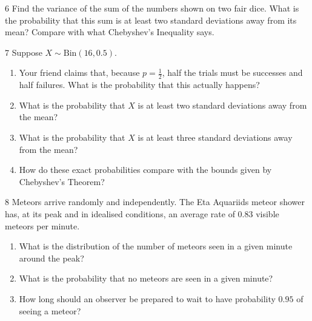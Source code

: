 \begin{exercise}{6}
    Find the variance of the sum of the numbers shown on two fair dice. What is
    the probability that this sum is at least two standard deviations away from
    its mean? Compare with what Chebyshev's Inequality says.
\end{exercise}

\begin{exercise}{7}
    Suppose $X\sim\mathrm{Bin}(16,0.5)$.
    \begin{enumerate}[label=(\alph*)]
        \item Your friend claims that, because $p=\frac12$, half the trials must
              be successes and half failures. What is the probability that this
              actually happens?
        \item What is the probability that $X$ is at least two standard
              deviations away from the mean?
        \item What is the probability that $X$ is at least three standard
              deviations away from the mean?
        \item How do these exact probabilities compare with the bounds given by
              Chebyshev's Theorem?
    \end{enumerate}
\end{exercise}

\begin{exercise}{8}
    Meteors arrive randomly and independently. The Eta Aquariids meteor shower
    has, at its peak and in idealised conditions, an average rate of $0.83$
    visible meteors per minute.
    \begin{enumerate}[label=(\alph*)]
        \item What is the distribution of the number of meteors seen in a given
              minute around the peak?
        \item What is the probability that no meteors are seen in a given minute?
        \item How long should an observer be prepared to wait to have
              probability $0.95$ of seeing a meteor?
    \end{enumerate}
\end{exercise}

